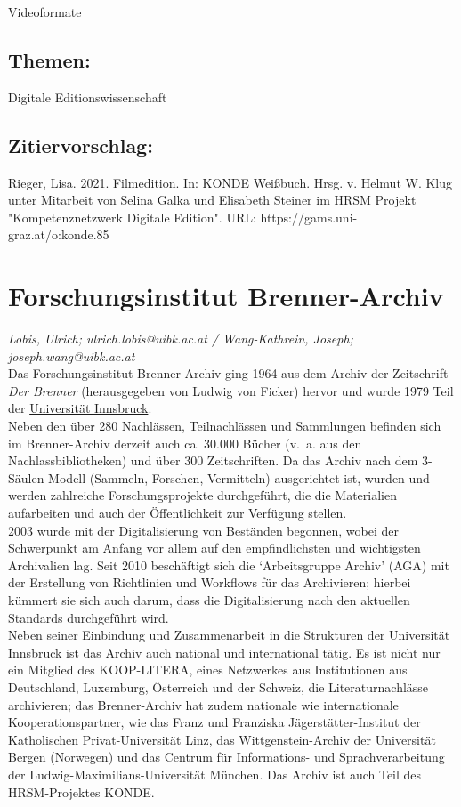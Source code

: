 \documentclass{article}
\begin{document}
{                           Videoformate}\subsection*{Themen:}Digitale Editionswissenschaft\subsection*{Zitiervorschlag:}Rieger, Lisa. 2021. Filmedition. In: KONDE Weißbuch. Hrsg. v. Helmut W. Klug unter Mitarbeit von Selina Galka und Elisabeth Steiner im HRSM Projekt "Kompetenznetzwerk Digitale Edition". URL: https://gams.uni-graz.at/o:konde.85\newpage\section*{Forschungsinstitut Brenner-Archiv} \emph{Lobis, Ulrich; ulrich.lobis@uibk.ac.at / Wang-Kathrein, Joseph; joseph.wang@uibk.ac.at}\\
        
    Das Forschungsinstitut Brenner-Archiv ging 1964 aus dem Archiv der Zeitschrift \emph{Der Brenner} (herausgegeben von Ludwig von Ficker) hervor und wurde 1979 Teil der \href{http://gams.uni-graz.at/o:konde.201}{Universität Innsbruck}.\\
            
        Neben den über 280 Nachlässen, Teilnachlässen und Sammlungen befinden sich im Brenner-Archiv derzeit auch ca. 30.000 Bücher (v. a. aus den Nachlassbibliotheken) und über 300 Zeitschriften. Da das Archiv nach dem 3-Säulen-Modell (Sammeln, Forschen, Vermitteln) ausgerichtet ist, wurden und werden zahlreiche Forschungsprojekte durchgeführt, die die Materialien aufarbeiten und auch der Öffentlichkeit zur Verfügung stellen.\\
            
        2003 wurde mit der \href{http://gams.uni-graz.at/o:konde.60}{Digitalisierung} von Beständen begonnen, wobei der Schwerpunkt am Anfang vor allem auf den empfindlichsten und wichtigsten Archivalien lag. Seit 2010 beschäftigt sich die ‘Arbeitsgruppe Archiv’ (AGA) mit der Erstellung von Richtlinien und Workflows für das Archivieren; hierbei kümmert sie sich auch darum, dass die Digitalisierung nach den aktuellen Standards durchgeführt wird.\\
            
        Neben seiner Einbindung und Zusammenarbeit in die Strukturen der Universität Innsbruck ist das Archiv auch national und international tätig. Es ist nicht nur ein Mitglied des KOOP-LITERA, eines Netzwerkes aus Institutionen aus Deutschland, Luxemburg, Österreich und der Schweiz, die Literaturnachlässe archivieren; das Brenner-Archiv hat zudem nationale wie internationale Kooperationspartner, wie das Franz und Franziska Jägerstätter-Institut der Katholischen Privat-Universität Linz, das Wittgenstein-Archiv der Universität Bergen (Norwegen) und das Centrum für Informations- und Sprachverarbeitung der Ludwig-Maximilians-Universität München. Das Archiv ist auch Teil des HRSM-Projektes KONDE.\\
            
\end{document}
